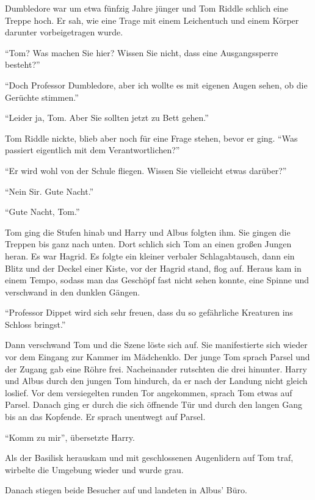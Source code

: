 \begin{rueckblick}
Dumbledore war um etwa fünfzig Jahre jünger und Tom Riddle schlich eine Treppe hoch. Er sah, wie eine Trage mit einem Leichentuch und einem Körper darunter vorbeigetragen wurde.

\enquote{Tom? Was machen Sie hier? Wissen Sie nicht, dass eine Ausgangssperre besteht?}

\enquote{Doch Professor Dumbledore, aber ich wollte es mit eigenen Augen sehen, ob die Gerüchte stimmen.}

\enquote{Leider ja, Tom. Aber Sie sollten jetzt zu Bett gehen.}

Tom Riddle nickte, blieb aber noch für eine Frage stehen, bevor er ging. \enquote{Was passiert eigentlich mit dem Verantwortlichen?}

\enquote{Er wird wohl von der Schule fliegen. \gst Wissen Sie vielleicht etwas darüber?}

\enquote{Nein Sir. \gst Gute Nacht.}

\enquote{Gute Nacht, Tom.}

Tom ging die Stufen hinab und Harry und Albus folgten ihm. Sie gingen die Treppen bis ganz nach unten. Dort schlich sich Tom an einen großen Jungen heran. Es war Hagrid. Es folgte ein kleiner verbaler Schlagabtausch, dann ein Blitz und der Deckel einer Kiste, vor der Hagrid stand, flog auf. Heraus kam in einem Tempo, sodass man das Geschöpf fast nicht sehen konnte, eine Spinne und verschwand in den dunklen Gängen.

\enquote{Professor Dippet wird sich sehr freuen, dass du so gefährliche Kreaturen ins Schloss bringst.}

Dann verschwand Tom und die Szene löste sich auf. Sie manifestierte sich wieder vor dem Eingang zur Kammer im Mädchenklo. Der junge Tom sprach Parsel und der Zugang gab eine Röhre frei. Nacheinander rutschten die drei hinunter. Harry und Albus durch den jungen Tom hindurch, da er nach der Landung nicht gleich loslief. Vor dem versiegelten runden Tor angekommen, sprach Tom etwas auf Parsel. Danach ging er durch die sich öffnende Tür und durch den langen Gang bis an das Kopfende. Er sprach unentwegt auf Parsel.

\enquote{Komm zu mir}, übersetzte Harry.

Als der Basilisk herauskam und mit geschlossenen Augenlidern auf Tom traf, wirbelte die Umgebung wieder und wurde grau.
\end{rueckblick}

Danach stiegen beide Besucher auf und landeten in Albus’ Büro.

